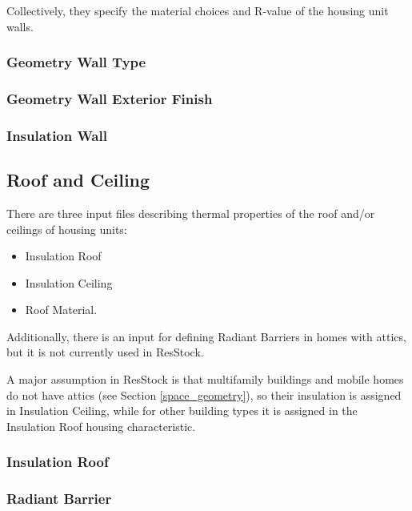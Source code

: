 Collectively, they specify the material choices and R-value of the housing unit walls.

\subsubsection{Geometry Wall Type}\label{geometry_wall_type}


\subsubsection{Geometry Wall Exterior Finish}\label{geometry_wall_exterior_finish}


\subsubsection{Insulation Wall}\label{insulation_wall}


\subsection{Roof and Ceiling}

There are three input files describing thermal properties of the roof and/or ceilings of housing units:
\begin{itemize}
    \item Insulation Roof
    \item Insulation Ceiling
    \item Roof Material.
\end{itemize}

Additionally, there is an input for defining Radiant Barriers in homes with attics, but it is not currently used in ResStock.

A major assumption in ResStock is that multifamily buildings and mobile homes do not have attics (see Section \ref{space_geometry}), so their insulation is assigned in Insulation Ceiling, while for other building types it is assigned in the Insulation Roof housing characteristic.

\subsubsection{Insulation Roof}\label{insulation_roof}


\subsubsection{Radiant Barrier}\label{radiant_barrier}


